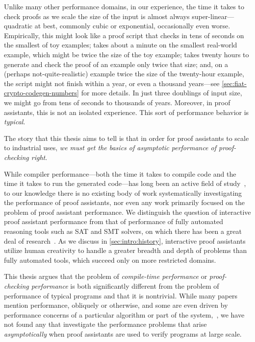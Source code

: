 Unlike many other performance domains, in our experience, the time it takes to check proofs as we scale the size of the input is almost always super-linear---quadratic at best, commonly cubic or exponential, occasionally even worse.
Empirically, this might look like a proof script that checks in tens of seconds on the smallest of toy examples; takes about a minute on the smallest real-world example, which might be twice the size of the toy example; takes twenty hours to generate and check the proof of an example only twice that size; and, on a (perhaps not-quite-realistic) example twice the size of the twenty-hour example, the script might not finish within a year, or even a thousand years---see \autoref{sec:fiat-crypto-codegen-numbers} for more details.
In just three doublings of input size, we might go from tens of seconds to thousands of years.
Moreover, in proof assistants, this is not an isolated experience.
This sort of performance behavior is \emph{typical}.


The story that this thesis aims to tell is that in order for proof assistants to scale to industrial uses, \emph{we must get the basics of asymptotic performance of proof-checking right}.

While compiler performance---both the time it takes to compile code and the time it takes to run the generated code---has long been an active field of study~\cite{CC++Performance2017,georges2007statistically,mytkowicz-wrong-data}, to our knowledge there is no existing body of work systematically investigating the performance of proof assistants, nor even any work primarily focused on the problem of proof assistant performance.
We distinguish the question of interactive proof assistant performance from that of performance of fully automated reasoning tools such as SAT and SMT solvers, on which there has been a great deal of research~\cite{Efficiency1994Boulton}.
As we discuss in \autoref{sec:intro:history}, interactive proof assistants utilize human creativity to handle a greater breadth and depth of problems than fully automated tools, which succeed only on more restricted domains.

This thesis argues that the problem of \emph{compile-time performance} or \emph{proof-checking performance} is both significantly different from the problem of performance of typical programs and that it is nontrivial.
While many papers mention performance, obliquely or otherwise, and some are even driven by performance concerns of a particular algorithm or part of the system,~\cites[p.~1382]{gonthier2008formal}{Efficiency1994Boulton}{Proving2005Benjamin}{Idris2Faster2020Brady}{Recognizing1989Benanav}{mechanical1990Pierce}{CelikETAL17iCoq}{PalmskogETAL18piCoq}{vmcompute}{thesis-nogin}{Idris2Faster2020Brady}, we have not found any that investigate the performance problems that arise \emph{asymptotically} when proof assistants are used to verify programs at large scale.

